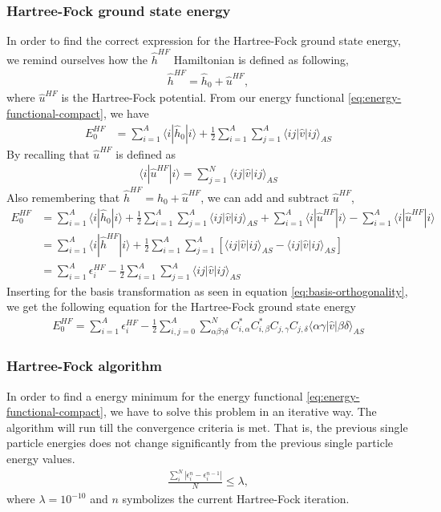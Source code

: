 \documentclass[11pt]{article}
\begin{document}
\subsubsection{Hartree-Fock ground state energy}
In order to find the correct expression for the Hartree-Fock ground state energy, we remind ourselves how the $\hat{h}^{HF}$ Hamiltonian is defined as following,
\begin{align*}
	\hat{h}^{HF} = \hat{h}_0 + \hat{u}^{HF},
\end{align*}
where $\hat{u}^{HF}$ is the Hartree-Fock potential. From our energy functional \eqref{eq:energy-functional-compact}, we have
\begin{align*}
	E_0^{HF} &= \sum^A_{i=1} \langle i |\hat{h}_0| i \rangle + \frac{1}{2}\sum^A_{i=1}\sum^A_{j=1} \langle ij |\hat{v}| ij \rangle_{AS}
\end{align*}
By recalling that $\hat{u}^{HF}$ is defined as 
\begin{align*}
	\langle i | \hat{u}^{HF} | i \rangle = \sum_{j=1}^N \langle ij | \hat{v} | ij \rangle_{AS}
\end{align*}
Also remembering that $\hat{h}^{HF} = \hat{h}_0 + \hat{u}^{HF}$, we can add and subtract $\hat{u}^{HF}$,
\begin{align*}
	E_0^{HF} &= \sum^A_{i=1} \langle i |\hat{h}_0| i \rangle + \frac{1}{2}\sum^A_{i=1}\sum^A_{j=1} \langle ij |\hat{v}| ij \rangle_{AS} + \sum^A_{i=1} \langle i | \hat{u}^{HF} | i \rangle - \sum^A_{i=1} \langle i | \hat{u}^{HF} | i \rangle \\
	&= \sum^A_{i=1} \langle i | \hat{h}^{HF} | i \rangle + \frac{1}{2}\sum^A_{i=1}\sum^A_{j=1} \left[ \langle ij |\hat{v}| ij \rangle_{AS} - \langle ij | \hat{v} | ij \rangle_{AS}\right] \\
	&= \sum^A_{i=1} \epsilon_i^{HF} - \frac{1}{2}\sum^A_{i=1}\sum^A_{j=1} \langle ij |\hat{v}| ij \rangle_{AS}
\end{align*}
Inserting for the basis transformation as seen in equation \eqref{eq:basis-orthogonality}, we get the following equation for the Hartree-Fock ground state energy
\begin{align}
	E_0^{HF} = \sum^A_{i=1} \epsilon^{HF}_i - \frac{1}{2}\sum^A_{i,j=0}\sum^N_{\alpha\beta\gamma\delta} C^*_{i,\alpha} C^*_{i,\beta}C_{j,\gamma}C_{j,\delta}\langle\alpha\gamma|\hat{v}|\beta\delta\rangle_{AS}
	\label{eq:hartree-fock-gs-energy}
\end{align}

\subsubsection{Hartree-Fock algorithm}
In order to find a energy minimum for the energy functional \eqref{eq:energy-functional-compact}, we have to solve this problem in an iterative way. The algorithm will run till the convergence criteria is met. That is, the previous single particle energies does not change significantly from the previous single particle energy values.
\begin{align}
	\frac{\sum_i^N|\epsilon^{n}_i - \epsilon^{n-1}_i|}{N} \leq \lambda,
	\label{eq:convergence-criteria}
\end{align}
where $\lambda=10^{-10}$ and $n$ symbolizes the current Hartree-Fock iteration.
\end{document}
